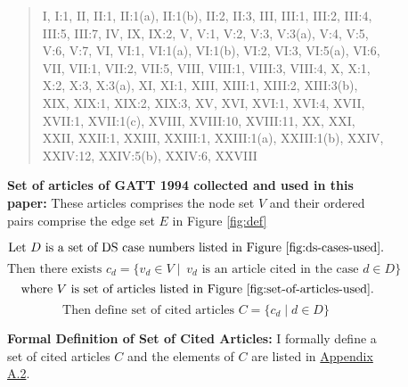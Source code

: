 \begin{figure}[h]
    \begin{quote}
    I, 
    I:1, 
    II, 
    II:1, 
    II:1(a), 
    II:1(b), 
    II:2, 
    II:3, 
    III, 
    III:1, 
    III:2, 
    III:4, 
    III:5, 
    III:7, 
    IV, 
    IX, 
    IX:2, 
    V, 
    V:1, 
    V:2, 
    V:3, 
    V:3(a), 
    V:4, 
    V:5, 
    V:6, 
    V:7, 
    VI, 
    VI:1, 
    VI:1(a), 
    VI:1(b), 
    VI:2, 
    VI:3, 
    VI:5(a), 
    VI:6, 
    VII, 
    VII:1, 
    VII:2, 
    VII:5, 
    VIII, 
    VIII:1, 
    VIII:3, 
    VIII:4, 
    X, 
    X:1, 
    X:2, 
    X:3, 
    X:3(a), 
    XI, 
    XI:1, 
    XIII, 
    XIII:1, 
    XIII:2, 
    XIII:3(b), 
    XIX, 
    XIX:1, 
    XIX:2, 
    XIX:3, 
    XV, 
    XVI, 
    XVI:1, 
    XVI:4, 
    XVII, 
    XVII:1, 
    XVII:1(c), 
    XVIII, 
    XVIII:10, 
    XVIII:11, 
    XX, 
    XXI, 
    XXII, 
    XXII:1, 
    XXIII, 
    XXIII:1, 
    XXIII:1(a), 
    XXIII:1(b), 
    XXIV, 
    XXIV:12, 
    XXIV:5(b), 
    XXIV:6, 
    XXVIII
    \end{quote}
    \caption{
        \textbf{
            Set of articles of GATT 1994 collected and used in this paper: 
            }These articles comprises the node set $V$ and their ordered pairs comprise the edge set $E$ in Figure \ref{fig:def}
        }
    \label{fig:set-of-articles-used}
\end{figure}

\begin{figure}[ht]
    \[\text{Let } D \text{ is a set of DS case numbers listed in Figure \ref{fig:ds-cases-used}.} \] %
    \[\text{Then there exists } c_d = \{v_d \in V \mid\ v_d \text{ is an article cited in the case } d \in D\} \]
    \[\text{ where } V \text{ is set of articles listed in Figure \ref{fig:set-of-articles-used}}.\]
    \[\text{Then define set of cited articles } C = \{c_d \mid d \in D\}\]
    \caption{\textbf{Formal Definition of Set of Cited Articles: }I formally define a set of cited articles $C$ and the elements of $C$ are listed in \hyperref[sub:cited-articles-table]{Appendix A.2}.}
    \label{fig:def:set-of-cited-articles}
\end{figure}


